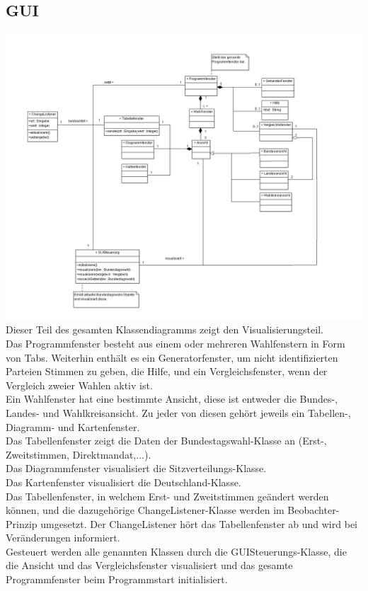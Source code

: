 \documentclass[10pt,a4paper]{article}
\begin{document}
\subsection{GUI}
\includegraphics[scale=0.4]{GUI-Abschnitt.png} \\
Dieser Teil des gesamten Klassendiagramms zeigt den Visualisierungsteil. \\
Das Programmfenster besteht aus einem oder mehreren Wahlfenstern in Form von Tabs. Weiterhin enthält es
ein Generatorfenster, um nicht identifizierten Parteien Stimmen zu geben, die Hilfe, und
ein Vergleichsfenster, wenn der Vergleich zweier Wahlen aktiv ist. \\
Ein Wahlfenster hat eine bestimmte Ansicht, diese ist entweder die Bundes-, Landes- und
Wahlkreisansicht. Zu jeder von diesen gehört jeweils ein Tabellen-, Diagramm- und Kartenfenster. \\
Das Tabellenfenster zeigt die Daten der Bundestagswahl-Klasse an (Erst-, Zweitstimmen, Direktmandat,...).\\
Das Diagrammfenster visualisiert die Sitzverteilungs-Klasse. \\
Das Kartenfenster visualisiert die Deutschland-Klasse. \\
Das Tabellenfenster, in welchem Erst- und Zweitstimmen geändert werden können, und die
dazugehörige ChangeListener-Klasse werden im Beobachter-Prinzip umgesetzt. Der ChangeListener
hört das Tabellenfenster ab und wird bei Veränderungen informiert. \\
Gesteuert werden alle genannten Klassen durch die GUISteuerungs-Klasse, die die Ansicht und das
Vergleichsfenster visualisiert und das gesamte Programmfenster beim Programmstart initialisiert.
\end{document}
